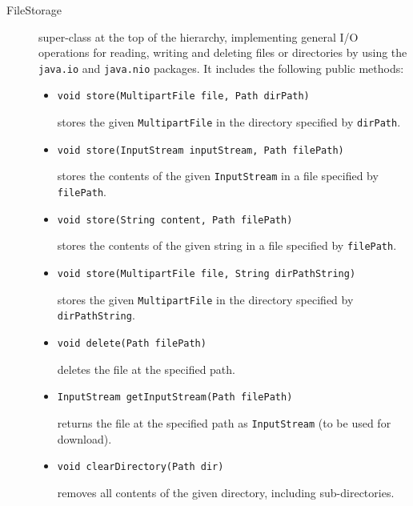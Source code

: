 \documentclass[a4paper]{usiinfbachelorproject}
\begin{document}
    \begin{description}

        \item[FileStorage] super-class at the top of the hierarchy, implementing general I/O operations
                           for reading, writing and deleting files or directories by using the
                           \texttt{java.io} and \texttt{java.nio} packages. 
                           It includes the following public methods:

            \begin{itemize}

                \item \texttt{void store(MultipartFile file, Path dirPath)}

                    stores the given \texttt{MultipartFile} in the directory specified by \texttt{dirPath}.

                \item \texttt{void store(InputStream inputStream, Path filePath)}

                    stores the contents of the given \texttt{InputStream} in a file specified by \texttt{filePath}.

                \item \texttt{void store(String content, Path filePath)}

                    stores the contents of the given string in a file specified by \texttt{filePath}.

                \item \texttt{void store(MultipartFile file, String dirPathString)}

                    stores the given \texttt{MultipartFile} in the directory specified by \texttt{dirPathString}.

                \item \texttt{void delete(Path filePath)}

                    deletes the file at the specified path.

                \item \texttt{InputStream getInputStream(Path filePath)}

                    returns the file at the specified path as \texttt{InputStream} (to be used for download).

                \item \texttt{void clearDirectory(Path dir)}

                    removes all contents of the given directory, including sub-directories.


\end{itemize}
\end{description}
\end{document}

